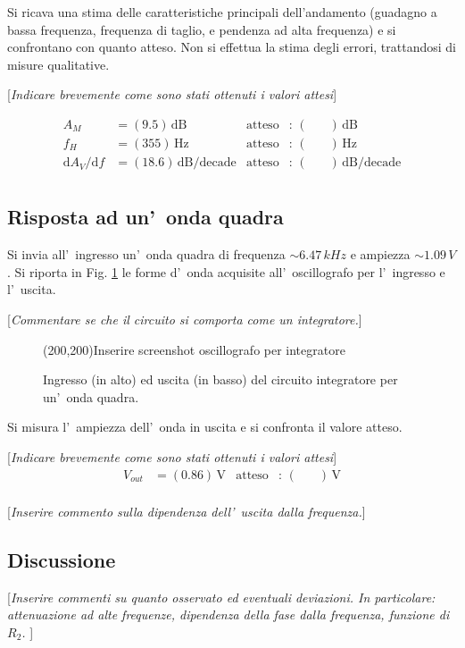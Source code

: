 \documentclass[10pt,a4paper]{article}
\newcommand{\rem}[1]{[\emph{#1}]}
\newcommand{\exn}{\phantom{xxx}}
\begin{document}
Si ricava una stima delle caratteristiche principali dell'andamento (guadagno a bassa frequenza, frequenza di taglio, e pendenza ad alta frequenza)
e si confrontano con quanto atteso. Non si effettua la stima degli errori, trattandosi di misure qualitative.

\rem{Indicare brevemente come sono stati ottenuti i valori attesi}

\begin{align*}
A_M &= (9.5)\,\mathrm{dB} & \mathrm{atteso} &:\,(\exn  )\, \mathrm{dB}  \\
f_H &= (355)\,\mathrm{Hz} & \mathrm{atteso} &:\,(\exn  )\, \mathrm{Hz} \\
{\mathrm{d}A_V}/{\mathrm{d}f} &= (18.6)\,\mathrm{dB/decade} & \mathrm{atteso} &:\,(\exn  )\, \mathrm{dB/decade}  \\
\end{align*}


%
\subsection*{Risposta ad un'~onda quadra}
Si invia all'~ingresso un'~onda quadra di frequenza $\sim 6.47\,kHz$ e ampiezza $\sim 1.09\,V$.
Si riporta in Fig. \ref{fig:oscinte} le forme d'~onda acquisite all'~oscillografo per l'~ingresso
e l'~uscita. 

\rem{Commentare se che il circuito si comporta come un integratore.}
%
\begin{figure}[htb]
\begin{center}
\framebox(200,200){Inserire screenshot oscillografo per integratore}
\end{center}
\caption{\small Ingresso (in alto) ed uscita (in basso) del circuito integratore per un'~onda quadra.}
\label{fig:oscinte}
\end{figure}
%

Si misura l'~ampiezza dell'~onda  in uscita e si confronta il valore atteso.

\rem{Indicare brevemente come sono stati ottenuti i valori attesi}
\begin{align*}
V_{out} &= (0.86 )\,\mathrm{V} & \mathrm{atteso} &:\,(\exn  )\, \mathrm{V}  \\
\end{align*}

\rem{Inserire commento sulla dipendenza dell'~uscita dalla frequenza.}
%

\subsection{Discussione}

\rem{Inserire commenti su quanto osservato ed eventuali deviazioni. 
In particolare: attenuazione ad alte frequenze, dipendenza della fase dalla frequenza, funzione di $R_2$. }

\end{document}
